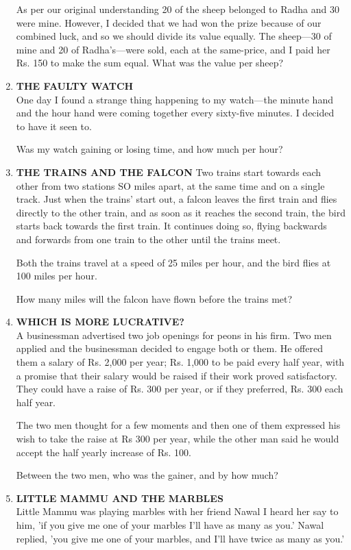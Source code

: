 \documentclass[12pt]{article}
\begin{document}
\begin{enumerate}
As per  our  original  understanding  20 of the  sheep belonged  to Radha  and 30 were  mine. However,  I decided  that  we had won  the prize  because of our  combined  luck,  and  so we should  divide  its value equally. The sheep—30  of mine  and 20 of Radha's—were  sold, each at the same-price,  and I paid  her  Rs.  150  to make the sum  equal. 
What  was  the value  per sheep? 
%
\item \textbf{THE  FAULTY  WATCH} \\
One day  I found  a strange  thing  happening  to my watch—the  minute  hand  and the hour  hand  were  coming together  every  sixty-five  minutes.  I decided  to have  it seen to. 

Was my watch  gaining  or losing  time,  and  how  much per hour? 
%
\item \textbf{THE  TRAINS  AND  THE  FALCON} 
Two trains  start  towards  each  other  from  two stations SO miles  apart,  at the same  time  and  on a single  track. Just when  the trains'  start  out,  a falcon  leaves  the first train and flies  directly  to the other  train,  and as soon  as it reaches  the second  train,  the bird  starts  back  towards  the first train.  It continues  doing  so, flying  backwards  and forwards  from  one  train  to the  other  until  the trains meet. 

Both  the trains  travel  at a speed  of 25 miles  per  hour, and the bird  flies  at 100  miles  per hour. 

How  many  miles  will the falcon  have  flown  before  the trains  met? 

\item \textbf{WHICH  IS MORE  LUCRATIVE?} \\ 
A businessman  advertised  two  job openings  for peons  in his firm.  Two  men  applied  and the businessman  decided to engage  both  or them.  He  offered  them  a salary  of Rs. 2,000  per  year;  Rs. 1,000  to be paid  every  half  year,  with a promise  that  their  salary  would  be raised  if their  work proved  satisfactory.  They  could  have  a raise  of Rs. 300 per year,  or if they  preferred,  Rs.  300  each  half year. 

The two  men  thought  for  a few  moments  and then one of them  expressed  his wish  to take  the  raise  at Rs 300 per  year,  while  the  other  man  said  he would  accept the half yearly  increase  of Rs. 100. 

Between  the two men,  who  was the gainer,  and by how much? 
%
\item \textbf{LITTLE  MAMMU  AND  THE  MARBLES} \\
Little  Mammu  was  playing  marbles  with  her friend  Nawal I heard  her say to him,  'if you give  me one of your  marbles I'll have  as many  as you.'  Nawal  replied,  'you  give  me one of your  marbles,  and  I'll  have  twice  as many as you.' 


\end{enumerate}
\end{document}
